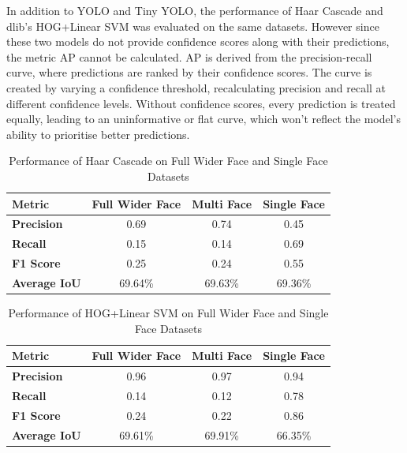 In addition to YOLO and Tiny YOLO, the performance of Haar Cascade and dlib's HOG+Linear SVM was evaluated on the same datasets. However since these two models do not provide confidence scores along with their predictions, the metric AP cannot be calculated. AP is derived from the precision-recall curve, where predictions are ranked by their confidence scores. The curve is created by varying a confidence threshold, recalculating precision and recall at different confidence levels. Without confidence scores, every prediction is treated equally, leading to an uninformative or flat curve, which won't reflect the model's ability to prioritise better predictions.

\begin{table}[h!]
\centering{}
\caption{Performance of Haar Cascade on Full Wider Face and Single Face Datasets}
\begin{tabular}{|l|c|c|c|}
\hline
\textbf{Metric}      & \textbf{Full Wider Face} & \textbf{Multi Face}  & \textbf{Single Face} \\ \hline
\textbf{Precision}   & 0.69      &  0.74           & 0.45               \\ \hline
\textbf{Recall}      & 0.15      &  0.14           & 0.69               \\ \hline
\textbf{F1 Score}    & 0.25      &  0.24           & 0.55               \\ \hline
\textbf{Average IoU} & 69.64\%     &  69.63\%           & 69.36\%              \\ \hline
\end{tabular}
\label{tab:HAAR}
\end{table}

\begin{table}[h!]
\centering{}
\caption{Performance of HOG+Linear SVM on Full Wider Face and Single Face Datasets}
\begin{tabular}{|l|c|c|c|}
\hline
\textbf{Metric}      & \textbf{Full Wider Face} & \textbf{Multi Face}  & \textbf{Single Face} \\ \hline
\textbf{Precision}   & 0.96       & 0.97           & 0.94               \\ \hline
\textbf{Recall}      & 0.14       & 0.12           & 0.78               \\ \hline
\textbf{F1 Score}    & 0.24       & 0.22           & 0.86               \\ \hline
\textbf{Average IoU} & 69.61\%      & 69.91\%           & 66.35\%              \\ \hline
\end{tabular}
\label{tab:HOGSVM}
\end{table}

